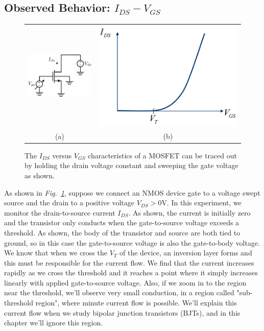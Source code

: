 \subsection{Observed Behavior: \texorpdfstring{$I_{DS}-V_{GS}$}{Drain Current vs. Gate Voltage}}
\begin{figure}[tb]
\centering
\begin{tabular}{cc}
\includegraphics[width=.35\columnwidth]{idvgs_sweep} &
\includegraphics[width=.55\columnwidth]{mos_ids_vgs}\\
(a) & (b)\\
\end{tabular}
\caption{The $I_{DS}$ versus $V_{GS}$ characteristics of a MOSFET can be traced out by holding the drain voltage constant and sweeping the gate voltage as shown.}
\label{fig:idvgs_sweep}
\end{figure}
As shown in \emph{Fig.~\ref{fig:idvgs_sweep}}, suppose we connect an NMOS device gate to a voltage swept source and the drain to a positive voltage $V_{DS} > 0$V.  In this experiment, we monitor the drain-to-source current $I_{DS}$.  As shown, the current is initially zero and the transistor only conducts when the gate-to-source voltage exceeds a threshold.  As shown, the body of the transistor and source are both tied to ground, so in this case the gate-to-source voltage is also the gate-to-body voltage.  We know that when we cross the $V_T$ of the device, an inversion layer forms and this must be responsible for the current flow.
We find that the current increases rapidly as we cross the threshold and it reaches a point where it simply increases linearly with applied gate-to-source voltage.  Also, if we zoom in to the region near the threshold, we'll observe very small conduction, in a region called "sub-threshold region", where minute current flow is possible.  We'll explain this current flow when we study bipolar junction transistors (BJTs), and in this chapter we'll ignore this region.  
